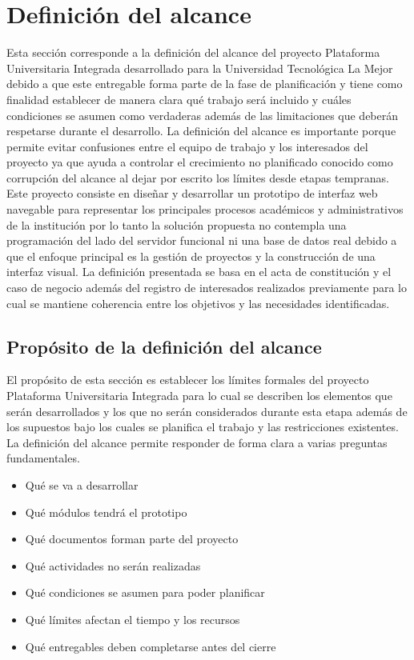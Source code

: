 \documentclass[11pt,spanish]{article}
\begin{document}
\newpage
\section{Definición del alcance}

Esta sección corresponde a la definición del alcance del proyecto Plataforma Universitaria Integrada desarrollado para la Universidad Tecnológica La Mejor debido a que este entregable forma parte de la fase de planificación y tiene como finalidad establecer de manera clara qué trabajo será incluido y cuáles condiciones se asumen como verdaderas además de las limitaciones que deberán respetarse durante el desarrollo. La definición del alcance es importante porque permite evitar confusiones entre el equipo de trabajo y los interesados del proyecto ya que ayuda a controlar el crecimiento no planificado conocido como corrupción del alcance al dejar por escrito los límites desde etapas tempranas. Este proyecto consiste en diseñar y desarrollar un prototipo de interfaz web navegable para representar los principales procesos académicos y administrativos de la institución por lo tanto la solución propuesta no contempla una programación del lado del servidor funcional ni una base de datos real debido a que el enfoque principal es la gestión de proyectos y la construcción de una interfaz visual. La definición presentada se basa en el acta de constitución y el caso de negocio además del registro de interesados realizados previamente para lo cual se mantiene coherencia entre los objetivos y las necesidades identificadas.

\subsection{Propósito de la definición del alcance}

El propósito de esta sección es establecer los límites formales del proyecto Plataforma Universitaria Integrada para lo cual se describen los elementos que serán desarrollados y los que no serán considerados durante esta etapa además de los supuestos bajo los cuales se planifica el trabajo y las restricciones existentes. La definición del alcance permite responder de forma clara a varias preguntas fundamentales.

\begin{itemize}
    \item Qué se va a desarrollar
    \item Qué módulos tendrá el prototipo
    \item Qué documentos forman parte del proyecto
    \item Qué actividades no serán realizadas
    \item Qué condiciones se asumen para poder planificar
    \item Qué límites afectan el tiempo y los recursos
    \item Qué entregables deben completarse antes del cierre
\end{itemize}
\end{document}
